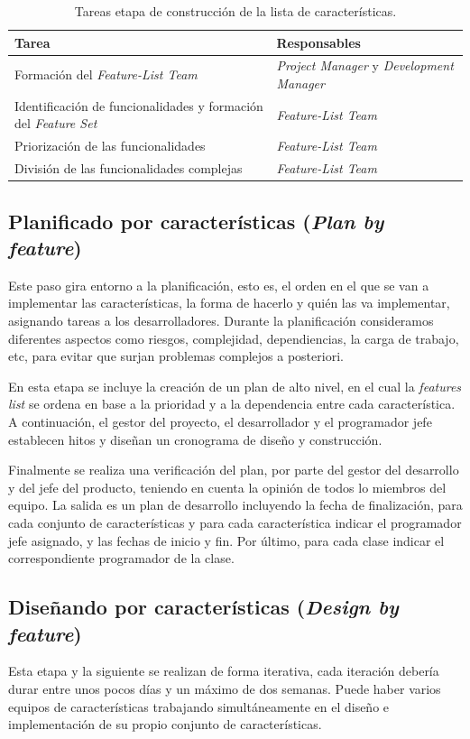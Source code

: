 \documentclass[11pt]{article}
\begin{document}
\begin{table}[H]
  \centering
\begin{tabular}{ |p{6cm}|p{6cm}|  }
	\hline
	Tarea & Responsables \\
	\hline
	Formación del
	\textit{Feature-List Team}  &    \textit{Project
		Manager} y 
	\textit{	Development
		Manager}\\
	Identificación de funcionalidades y formación del \textit{Feature Set}  & \textit{Feature-List Team}\\
	Priorización de las funcionalidades &  \textit{Feature-List Team}\\
	División de las funcionalidades complejas    & \textit{Feature-List Team}\\
	\hline
\end{tabular}
\caption{Tareas etapa de construcción de la lista de características.}\label{tab:BFL}
\end{table}

\subsection{Planificado por características (\textit{Plan by feature})}
Este paso gira entorno a la planificación, esto es, el orden en el que se van a implementar las características, la forma de hacerlo y quién las va implementar, asignando tareas a los desarrolladores.
Durante la planificación consideramos diferentes aspectos como riesgos, complejidad, dependiencias, la carga de trabajo, etc, para evitar que surjan problemas complejos a posteriori.

En esta etapa se incluye la creación de un plan de alto nivel, en el cual la \textit{features list} se ordena en base a la prioridad y a la dependencia entre cada característica. A continuación, el gestor del proyecto, el desarrollador y el programador jefe establecen hitos y diseñan un cronograma de diseño y construcción.

Finalmente se realiza una verificación del plan, por parte del gestor del desarrollo y del jefe del producto, teniendo en cuenta la opinión de todos lo miembros del equipo. La salida es un plan de desarrollo incluyendo la fecha de finalización, para cada conjunto de características y para cada característica indicar el programador jefe asignado, y las fechas de inicio y fin. Por último, para cada clase indicar el correspondiente programador de la clase.


\subsection{Diseñando por características (\textit{Design by feature})}
Esta etapa y la siguiente se realizan de forma iterativa, cada iteración debería durar entre unos pocos días y un máximo de dos semanas. Puede haber varios equipos de características trabajando simultáneamente en el diseño e implementación de su propio conjunto de características. 
\end{document}

